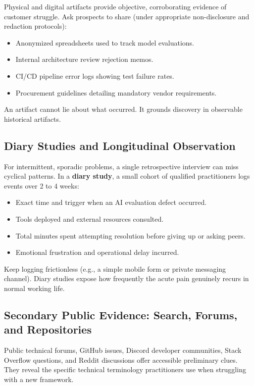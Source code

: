 Physical and digital artifacts provide objective, corroborating evidence of customer struggle. Ask prospects to share (under appropriate non-disclosure and redaction protocols):
\begin{itemize}[leftmargin=1.2em,itemsep=0.2ex]
  \item Anonymized spreadsheets used to track model evaluations.
  \item Internal architecture review rejection memos.
  \item CI/CD pipeline error logs showing test failure rates.
  \item Procurement guidelines detailing mandatory vendor requirements.
\end{itemize}
An artifact cannot lie about what occurred. It grounds discovery in observable historical artifacts.

\subsection{Diary Studies and Longitudinal Observation}

For intermittent, sporadic problems, a single retrospective interview can miss cyclical patterns. In a \textbf{diary study}, a small cohort of qualified practitioners logs events over 2 to 4 weeks:
\begin{itemize}[leftmargin=1.2em,itemsep=0.2ex]
  \item Exact time and trigger when an AI evaluation defect occurred.
  \item Tools deployed and external resources consulted.
  \item Total minutes spent attempting resolution before giving up or asking peers.
  \item Emotional frustration and operational delay incurred.
\end{itemize}
Keep logging frictionless (e.g., a simple mobile form or private messaging channel). Diary studies expose how frequently the acute pain genuinely recurs in normal working life.

\subsection{Secondary Public Evidence: Search, Forums, and Repositories}

Public technical forums, GitHub issues, Discord developer communities, Stack Overflow questions, and Reddit discussions offer accessible preliminary clues. They reveal the specific technical terminology practitioners use when struggling with a new framework.

